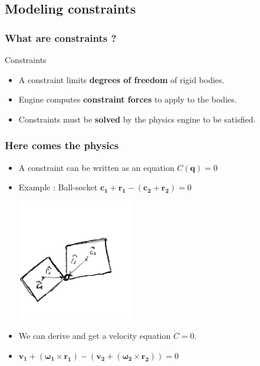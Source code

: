 \documentclass{beamer}
\begin{document}
\subsection{Modeling constraints}
\begin{frame}
 \frametitle{What are constraints ?}
 \begin{block}{Constraints}
  \begin{itemize}
    \item A constraint limits \textbf{degrees of freedom} of rigid bodies. \pause
    \item Engine computes \textbf{constraint forces} to apply to the bodies.
    \item Constraints must be \textbf{solved} by the physics engine to be satisfied.
  \end{itemize}
  \end{block}
\end{frame}


\begin{frame}
 \frametitle{Here comes the physics}
 \begin{itemize}
  \item A constraint can be written as an equation $C(\mathbf{q}) = 0$
  \item Example : Ball-socket $\mathbf{c_1} + \mathbf{r_1} - (\mathbf{c_2} + \mathbf{r_2}) = 0$\\
  \begin{center}\includegraphics[width = 0.4\textwidth]{jacobian1.png}\end{center}
  \pause
  \item We can derive and get a velocity equation $\dot{C} = 0$.
  \item $\mathbf{v_1} + (\mathbf{\omega_1} \times \mathbf{r_1}) - ( \mathbf{v_2} + (\mathbf{\omega_2} \times \mathbf{r_2})) = 0$
  \end{itemize}
\end{frame}
\end{document}
